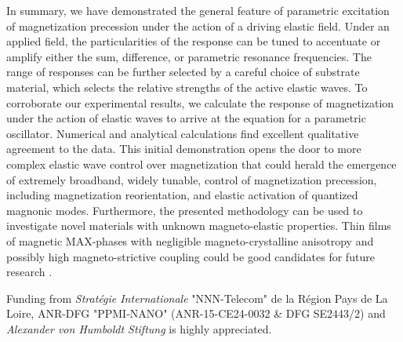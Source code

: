 \documentclass[aps,showpacs,prb,twocolumn,superscriptaddress]{revtex4}
\begin{document}

In summary, we have demonstrated the general feature of parametric excitation of magnetization precession under the action of a driving elastic field. Under an applied field, the particularities of the response can be tuned to accentuate or amplify either the sum, difference, or  parametric resonance frequencies.  The range of responses can be further selected by a careful choice of substrate material, which selects the relative strengths of the active elastic waves. To corroborate our experimental results, we calculate the response of magnetization under the action of elastic waves to arrive at the equation for a parametric oscillator.   Numerical and analytical calculations find excellent qualitative agreement to the data.  This initial demonstration opens the door to more complex elastic wave\cite{Schulein} control over magnetization that could herald the emergence of extremely broadband, widely tunable, control of magnetization precession, including magnetization reorientation, and elastic activation of quantized magnonic modes.  Furthermore, the presented methodology can be used to investigate novel materials with unknown magneto-elastic properties. Thin films of magnetic MAX-phases with negligible magneto-crystalline anisotropy and possibly high magneto-strictive coupling could be good candidates for future research \cite{Salikhov2015}.

Funding from {\it Strat\'{e}gie
Internationale} "NNN-Telecom" de la R\'{e}gion Pays de La Loire, ANR-DFG "PPMI-NANO" (ANR-15-CE24-0032 \& DFG SE2443/2) and {\it Alexander von Humboldt Stiftung} is highly appreciated.

%
%
\end{document}
